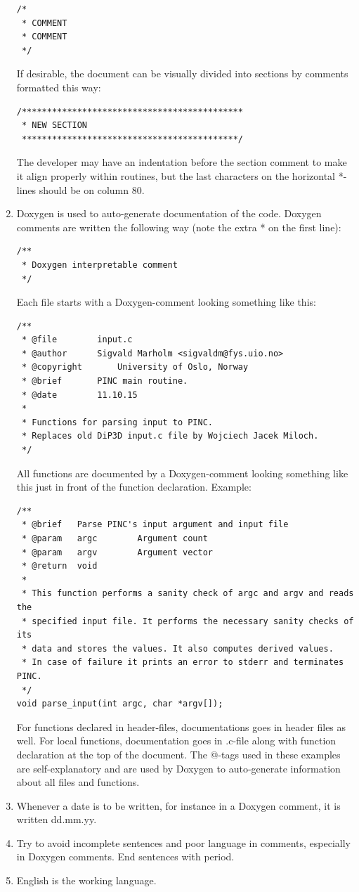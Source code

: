 \documentclass[10pt,a4paper]{article}
\begin{document}
\begin{enumerate}
	\begin{lstlisting}
/*
 * COMMENT
 * COMMENT
 */
	 \end{lstlisting}
	If desirable, the document can be visually divided into sections by comments formatted this way:
	 \begin{lstlisting}
/********************************************
 * NEW SECTION
 *******************************************/
	 \end{lstlisting}
	 The developer may have an indentation before the section comment to make it align properly within routines, but the last characters on the horizontal *-lines should be on column 80.
	 \item Doxygen is used to auto-generate documentation of the code. Doxygen comments are written the following way (note the extra * on the first line):
	 \begin{lstlisting}
/**
 * Doxygen interpretable comment
 */
	 \end{lstlisting}
	 Each file starts with a Doxygen-comment looking something like this:
	 \begin{lstlisting}
/**
 * @file		input.c
 * @author		Sigvald Marholm <sigvaldm@fys.uio.no>
 * @copyright		University of Oslo, Norway
 * @brief		PINC main routine.
 * @date		11.10.15
 *
 * Functions for parsing input to PINC.
 * Replaces old DiP3D input.c file by Wojciech Jacek Miloch.
 */	 	
	 \end{lstlisting}
	 All functions are documented by a Doxygen-comment looking something like this just in front of the function declaration. Example: 
	 \begin{lstlisting}
/**
 * @brief	Parse PINC's input argument and input file
 * @param	argc		Argument count
 * @param	argv		Argument vector
 * @return	void 
 *
 * This function performs a sanity check of argc and argv and reads the
 * specified input file. It performs the necessary sanity checks of its
 * data and stores the values. It also computes derived values.
 * In case of failure it prints an error to stderr and terminates PINC.
 */
void parse_input(int argc, char *argv[]);
	\end{lstlisting}
	For functions declared in header-files, documentations goes in header files as well. For local functions, documentation goes in .c-file along with function declaration at the top of the document. The @-tags used in these examples are self-explanatory and are used by Doxygen to auto-generate information about all files and functions.
	\item Whenever a date is to be written, for instance in a Doxygen comment, it is written dd.mm.yy.
	\item Try to avoid incomplete sentences and poor language in comments, especially in Doxygen comments. End sentences with period.
	\item English is the working language.
\end{enumerate}
\end{document}

